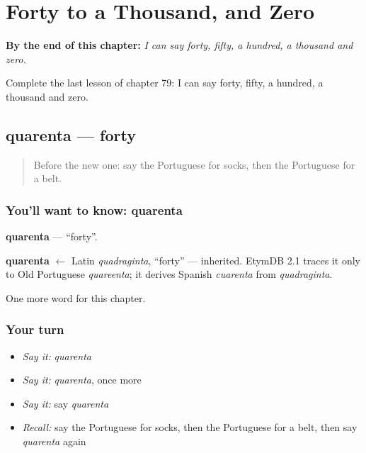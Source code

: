 
\chapter{Forty to a Thousand, and Zero}
\label{ch:pt-forty-to-a-thousand-and-zero}

\begin{chapteropening}
\textbf{By the end of this chapter:} \emph{I can say forty, fifty, a hundred, a thousand and zero.}

Complete the last lesson of chapter 79: I can say forty, fifty, a hundred, a thousand and zero.
\end{chapteropening}

\section[quarenta]{quarenta — forty}

\label{lesson:PT-C79-quarenta}



\begin{quote}
Before the new one: say the Portuguese for socks, then the Portuguese for a belt.
\end{quote}

\subsection*{You'll want to know: quarenta}
\textbf{quarenta} — \textquotedblleft{}forty\textquotedblright{}.

\begin{cousinweb}
\textbf{quarenta} $\leftarrow$ Latin \emph{quadraginta}, \textquotedblleft{}forty\textquotedblright{} — inherited. EtymDB 2.1 traces it only to Old Portuguese \emph{quareenta}; it derives Spanish \emph{cuarenta} from \emph{quadraginta}.
\end{cousinweb}

\begin{grammarlens}[title={What you've built}]
One more word for this chapter.
\end{grammarlens}

\subsection*{Your turn}
\begin{itemize}
\raggedright
  \item \emph{Say it:} \emph{quarenta}
  \item \emph{Say it:} \emph{quarenta}, once more
  \item \emph{Say it:} say \emph{quarenta}
  \item \emph{Recall:} say the Portuguese for socks, then the Portuguese for a belt, then say \emph{quarenta} again
\end{itemize}

